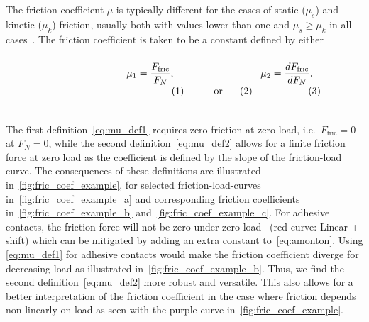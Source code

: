 The friction coefficient $\mu$ is typically different for the cases of static
($\mu_s$) and kinetic ($\mu_k$) friction, usually both with values lower than
one and $\mu_s \ge \mu_k$ in all cases~\cite[p. 6]{gnecco_meyer_2015}. The friction coefficient is taken to be a constant defined by either~\cite{gao_frictional_2004} \\
\vspace{0.1cm}
\begin{subequations}
\noindent\begin{minipage}{.2\linewidth}
  \hfill
\end{minipage}
\begin{minipage}[b]{0.2\linewidth}
  \begin{align}
    \mu_1 = \frac{F_{\text{fric}}}{F_N},
    \label{eq:mu_def1}
  \end{align}
\end{minipage}
\begin{minipage}[b]{0.2\linewidth}
  \begin{align*}
    \text{or}
  \end{align*}
\end{minipage}
\begin{minipage}[b]{0.2\linewidth}
  \begin{align}
    \mu_2 = \frac{dF_{\text{fric}}}{dF_N}.
    \label{eq:mu_def2}
  \end{align}
\end{minipage}
\begin{minipage}{.2\linewidth}
\end{minipage}
\label{eq:mu_def}
\end{subequations}
\vspace{0.1cm}
\\
\noindent The first definition~\cref{eq:mu_def1} requires zero friction at zero
load, i.e.\ $F_{\text{fric}} = 0$ at $F_N = 0$, while the second definition~\cref{eq:mu_def2} allows for a finite friction force at zero load as the
coefficient is defined by the slope of the friction-load curve. The
consequences of these definitions are illustrated in~\cref{fig:fric_coef_example}, for selected friction-load-curves in~\cref{fig:fric_coef_example_a} and corresponding friction coefficients in~\cref{fig:fric_coef_example_b} and~\cref{fig:fric_coef_example_c}. For adhesive
contacts, the friction force will not be zero under zero load~\cite{gao_frictional_2004} (red curve: Linear
+ shift) which can be mitigated by adding an extra constant to~\cref{eq:amonton}. Using \cref{eq:mu_def1} for adhesive contacts would make the friction coefficient diverge for decreasing load as illustrated in~\cref{fig:fric_coef_example_b}. Thus, we find the second
definition~\cref{eq:mu_def2} more robust and versatile. This also allows for a better interpretation of the friction coefficient in the case where
friction depends non-linearly on load as seen with the purple curve in~\cref{fig:fric_coef_example}. 


